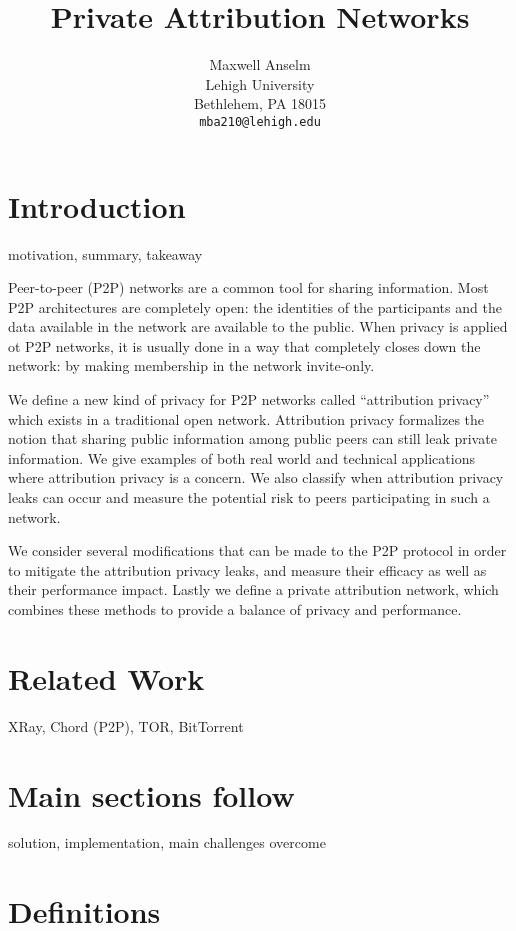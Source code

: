 \documentclass{article}
\title{Private Attribution Networks}
\author{
Maxwell Anselm\\
Lehigh University\\
Bethlehem, PA 18015\\
\texttt{mba210@lehigh.edu}\\
}
\begin{document}
\maketitle

\section{Introduction}

motivation, summary, takeaway

Peer-to-peer (P2P) networks are a common tool for sharing information. Most P2P
architectures are completely open: the identities of the participants and the
data available in the network are available to the public. When privacy is
applied ot P2P networks, it is usually done in a way that completely closes down
the network: by making membership in the network invite-only\cite{privatep2p}.

We define a new kind of privacy for P2P networks called ``attribution privacy''
which exists in a traditional open network. Attribution privacy formalizes
the notion that sharing public information among public peers can still leak
private information. We give examples of both real world and technical
applications where attribution privacy is a concern. We also classify when
attribution privacy leaks can occur and measure the potential risk to peers
participating in such a network.

We consider several modifications that can be made to the P2P protocol in order
to mitigate the attribution privacy leaks, and measure their efficacy as well as
their performance impact. Lastly we define a private attribution network, which
combines these methods to provide a balance of privacy and performance.

\section{Related Work}

XRay, Chord (P2P), TOR, BitTorrent

\section*{Main sections follow}

solution, implementation, main challenges overcome

\section{Definitions}
\end{document}
